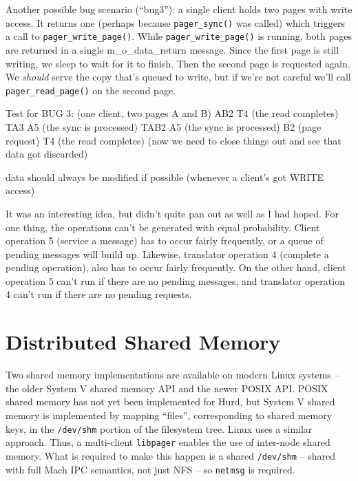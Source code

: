 \documentclass{article}
\def\libpager{{\tt libpager}\xspace}
\def\netmsg{{\tt netmsg}\xspace}
\def\pagersync{{\tt pager_sync()}\xspace}
\def\pagerwritepage{{\tt pager_write_page()}\xspace}
\def\pagerreadpage{{\tt pager_read_page()}\xspace}
\begin{document}
Another possible bug scenario (``bug3''): a single client holds two
pages with write access.  It returns one (perhaps because \pagersync
was called) which triggers a call to \pagerwritepage.  While
\pagerwritepage is running, both pages are returned in a single
m_o_data_return message.  Since the first page is still writing, we
sleep to wait for it to finish.  Then the second page is requested
again.  We {\it should} serve the copy that's queued to write, but if
we're not careful we'll call \pagerreadpage on the second page.



Test for BUG 3: (one client, two pages A and B)
  AB2 T4 (the read completes) TA3 A5 (the sync is processed) TAB2 A5 (the sync is processed)
    B2 (page request) T4 (the read completes)
    (now we need to close things out and see that data got discarded)

data should always be modified if possible (whenever a client's got WRITE access)


It was an interesting idea, but didn't quite pan out as well as I had
hoped.  For one thing, the operations can't be generated with equal
probability.  Client operation 5 (service a message) has to occur
fairly frequently, or a queue of pending messages will build up.
Likewise, translator operation 4 (complete a pending operation), also
has to occur fairly frequently.  On the other hand, client operation 5
can't run if there are no pending messages, and translator operation 4
can't run if there are no pending requests.

\section{Distributed Shared Memory}

Two shared memory implementations are available on modern Linux
systems -- the older System V shared memory API and the newer POSIX
API.  POSIX shared memory has not yet been implemented for Hurd, but
System V shared memory is implemented by mapping ``files'',
corresponding to shared memory keys, in the {\tt /dev/shm} portion of
the filesystem tree.  Linux uses a similar approach.  Thus, a
multi-client \libpager enables the use of inter-node shared memory.
What is required to make this happen is a shared {\tt /dev/shm} --
shared with full Mach IPC semantics, not just NFS -- so \netmsg is
required.

\end{document}
